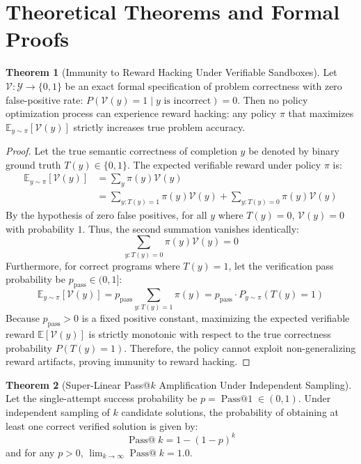 \documentclass[11pt,a4paper]{article}
\theoremstyle{definition}
\newtheorem{theorem}{\textbf{Theorem}}[section]
\begin{document}
\section{Theoretical Theorems and Formal Proofs}

\begin{theorem}[Immunity to Reward Hacking Under Verifiable Sandboxes]
Let $\mathcal{V}: \mathcal{Y} \to \{0, 1\}$ be an exact formal specification of problem correctness with zero false-positive rate: $P(\mathcal{V}(y) = 1 \mid y \text{ is incorrect}) = 0$. Then no policy optimization process can experience reward hacking: any policy $\pi$ that maximizes $\mathbb{E}_{y \sim \pi}[\mathcal{V}(y)]$ strictly increases true problem accuracy.
\end{theorem}

\begin{proof}
Let the true semantic correctness of completion $y$ be denoted by binary ground truth $T(y) \in \{0, 1\}$.
The expected verifiable reward under policy $\pi$ is:
{\boldmath
\begin{align}
\mathbb{E}_{y \sim \pi}[\mathcal{V}(y)] &= \sum_{y} \pi(y) \mathcal{V}(y) \\
&= \sum_{y: T(y)=1} \pi(y) \mathcal{V}(y) + \sum_{y: T(y)=0} \pi(y) \mathcal{V}(y)
\end{align}
}
By the hypothesis of zero false positives, for all $y$ where $T(y) = 0$, $\mathcal{V}(y) = 0$ with probability $1$.
Thus, the second summation vanishes identically:
{\boldmath
\begin{equation}
\sum_{y: T(y)=0} \pi(y) \mathcal{V}(y) = 0
\end{equation}
}
Furthermore, for correct programs where $T(y) = 1$, let the verification pass probability be $p_{\text{pass}} \in (0, 1]$:
{\boldmath
\begin{equation}
\mathbb{E}_{y \sim \pi}[\mathcal{V}(y)] = p_{\text{pass}} \sum_{y: T(y)=1} \pi(y) = p_{\text{pass}} \cdot P_{y \sim \pi}(T(y) = 1)
\end{equation}
}
Because $p_{\text{pass}} > 0$ is a fixed positive constant, maximizing the expected verifiable reward $\mathbb{E}[\mathcal{V}(y)]$ is strictly monotonic with respect to the true correctness probability $P(T(y) = 1)$.
Therefore, the policy cannot exploit non-generalizing reward artifacts, proving immunity to reward hacking.
\end{proof}

\begin{theorem}[Super-Linear Pass@$k$ Amplification Under Independent Sampling]
Let the single-attempt success probability be $p = \operatorname{Pass@1} \in (0, 1)$. Under independent sampling of $k$ candidate solutions, the probability of obtaining at least one correct verified solution is given by:
{\boldmath
\begin{equation}
\operatorname{Pass@}k = 1 - (1 - p)^k
\end{equation}
}
and for any $p > 0$, $\lim_{k \to \infty} \operatorname{Pass@}k = 1.0$.
\end{theorem}
\end{document}
